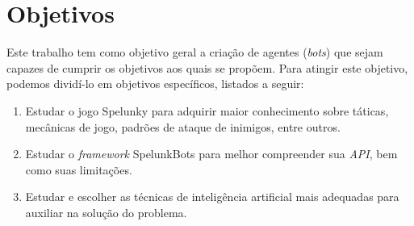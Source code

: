 \chapter{\label{chap:objectives}Objetivos}
Este trabalho tem como objetivo geral a criação de agentes (\textit{bots}) que
sejam capazes de cumprir os objetivos aos quais se propõem. Para atingir este
objetivo, podemos dividí-lo em objetivos específicos, listados a seguir:

\begin{enumerate}
    \item \label{objectives:study} Estudar o jogo Spelunky para adquirir maior conhecimento sobre
        táticas, mecânicas de jogo, padrões de ataque de inimigos, entre
        outros.

    \item Estudar o \textit{framework} SpelunkBots para melhor compreender sua
        \textit{API}, bem como suas limitações.

    \item Estudar e escolher as técnicas de inteligência artificial mais
        adequadas para auxiliar na solução do problema.
\end{enumerate}
